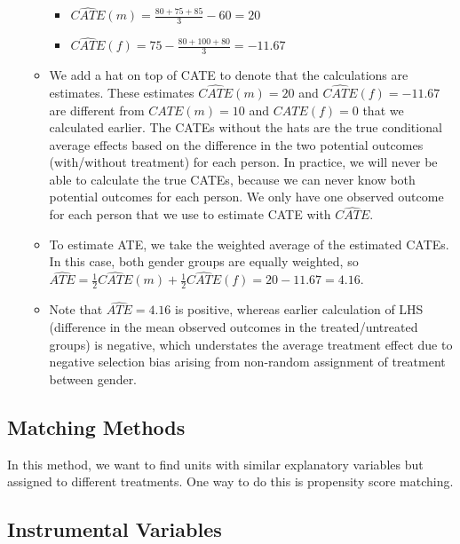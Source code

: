 \documentclass[]{book}
\providecommand{\tightlist}{%
  \setlength{\itemsep}{0pt}\setlength{\parskip}{0pt}}
\begin{document}
\begin{itemize}
\begin{itemize}
    \begin{itemize}
    \tightlist
    \item
      \(\widehat{CATE}(m) = \frac{80+75+85}{3}-60 = 20\)
    \item
      \(\widehat{CATE}(f) = 75 - \frac{80+100+80}{3} = -11.67\)
    \end{itemize}
  \item
    We add a hat on top of CATE to denote that the calculations are estimates. These estimates \(\widehat{CATE}(m)=20\) and \(\widehat{CATE}(f)=-11.67\) are different from \(CATE(m)=10\) and \(CATE(f)=0\) that we calculated earlier. The CATEs without the hats are the true conditional average effects based on the difference in the two potential outcomes (with/without treatment) for each person. In practice, we will never be able to calculate the true CATEs, because we can never know both potential outcomes for each person. We only have one observed outcome for each person that we use to estimate CATE with \(\widehat{CATE}\).
  \item
    To estimate ATE, we take the weighted average of the estimated CATEs. In this case, both gender groups are equally weighted, so \(\widehat{ATE} = \frac{1}{2}\widehat{CATE}(m)+\frac{1}{2}\widehat{CATE}(f) = 20 - 11.67 = 4.16\).
  \item
    Note that \(\widehat{ATE} = 4.16\) is positive, whereas earlier calculation of LHS (difference in the mean observed outcomes in the treated/untreated groups) is negative, which understates the average treatment effect due to negative selection bias arising from non-random assignment of treatment between gender.
  \end{itemize}
\end{itemize}

\hypertarget{matching-methods}{%
\subsection{Matching Methods}\label{matching-methods}}

In this method, we want to find units with similar explanatory variables but assigned to different treatments. One way to do this is propensity score matching.

\hypertarget{instrumental-variables}{%
\subsection{Instrumental Variables}\label{instrumental-variables}}
\end{document}
